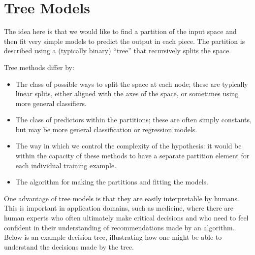 \section{Tree Models}
\label{sec-np_trees}

The idea here is that we would like to find a partition of the input
space and then fit very simple models to predict the output in each
piece.  The partition is described using a (typically binary)
``tree'' that recursively splits the space.

\medskip
Tree methods differ by:
\begin{itemize}
  \item The class of possible ways to split the space at each node;
        these are typically linear splits, either aligned with the axes of
        the space, or sometimes using more general classifiers.
  \item The class of predictors within the partitions; these are often
        simply constants, but may be more general classification or
        regression models.
  \item The way in which we control the complexity of the hypothesis: it
        would be within the capacity of these methods to have a separate
        partition element for each individual training example.
  \item The algorithm for making the partitions and fitting the models.
\end{itemize}

One advantage of tree models is that they are easily interpretable by
humans.  This is important in application domains, such as medicine,
where there are human experts who often ultimately make critical
decisions and who need to feel confident in their understanding of
recommendations made by an algorithm. Below is an example decision
tree, illustrating how one might be able to understand the
decisions made by the tree.
\medskip


